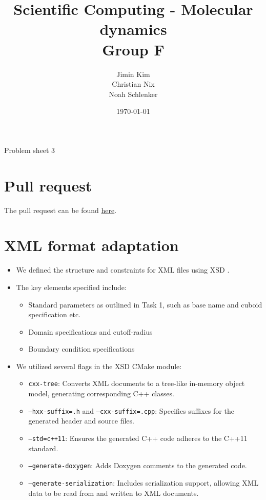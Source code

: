 \documentclass{article}
\title{Scientific Computing - Molecular dynamics \\ Group F}
\author{
    Jimin Kim \\
    Christian Nix \\
    Noah Schlenker
}
\date{\today}
\newcommand{\subtitle}{Problem sheet 3}
\begin{document}
\maketitle

\begin{center}
    \LARGE \subtitle{}
\end{center}

\section{Pull request}
\label{sec:pr}
The pull request can be found \href{https://github.com/noahpy/MolSim-SS24/pull/33}{here}.

\section{XML format adaptation}
\label{sec:xml}

\begin{itemize}
    \item We defined the structure and constraints for XML files using XSD .
    \item The key elements specified include:
    \begin{itemize}
        \item Standard parameters as outlined in Task 1, such as base name and cuboid specification etc.
        \item Domain specifications and cutoff-radius
        \item Boundary condition specifications
    \end{itemize}
    \item We utilized several flags in the XSD CMake module:
    \begin{itemize}
        \item \texttt{cxx-tree}: Converts XML documents to a tree-like in-memory object model, generating corresponding C++ classes.
        \item \texttt{--hxx-suffix=.h} and \texttt{--cxx-suffix=.cpp}: Specifies suffixes for the generated header and source files.
        \item \texttt{--std=c++11}: Ensures the generated C++ code adheres to the C++11 standard.
        \item \texttt{--generate-doxygen}: Adds Doxygen comments to the generated code.
        \item \texttt{--generate-serialization}: Includes serialization support, allowing XML data to be read from and written to XML documents.
    \end{itemize}
\end{itemize}
\end{document}
